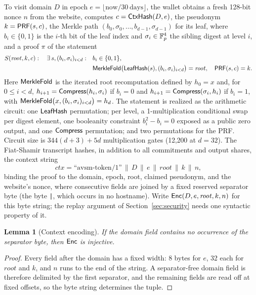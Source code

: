 \documentclass[11pt]{article}
\newtheorem{lemma}{Lemma}
\theoremstyle{definition}
\begin{document}
To visit domain $D$ in epoch $e = \lfloor \mathrm{now} / 30\ \mathrm{days} \rfloor$, the
wallet obtains a fresh 128-bit nonce $n$ from the website, computes $c = \mathsf{CtxHash}(D, e)$,
the pseudonym $k = \mathsf{PRF}(s, c)$, the Merkle path $(b_0, \sigma_0, \ldots, b_{d-1},
\sigma_{d-1})$ for its leaf, where $b_i \in \{0,1\}$ is the $i$-th bit of the leaf index
and $\sigma_i \in \mathbb{F}_p^4$ the sibling digest at level $i$, and a proof $\pi$ of the
statement
\begin{align*}
S(\mathit{root}, k, c):\quad \exists\, s, (b_i, \sigma_i)_{i<d}:\quad
& b_i \in \{0,1\},\\
& \mathsf{MerkleFold}\bigl(\mathsf{LeafHash}(s), (b_i, \sigma_i)_{i<d}\bigr) = \mathit{root},\quad
\mathsf{PRF}(s, c) = k.
\end{align*}
Here $\mathsf{MerkleFold}$ is the iterated root recomputation defined by $h_0 = x$ and, for $0 \le
i < d$, $h_{i+1} = \mathsf{Compress}(h_i, \sigma_i)$ if $b_i = 0$ and $h_{i+1} =
\mathsf{Compress}(\sigma_i, h_i)$ if $b_i = 1$, with $\mathsf{MerkleFold}\bigl(x, (b_i,
\sigma_i)_{i<d}\bigr) = h_d$. The statement is realized as the arithmetic circuit: one
$\mathsf{LeafHash}$ permutation; per level, a 1-multiplication conditional swap per digest
element, one booleanity constraint $b_i^2 - b_i = 0$ exposed as a public zero output, and
one $\mathsf{Compress}$ permutation; and two permutations for the PRF. Circuit size is $344(d+3) +
5d$ multiplication gates (12{,}200 at $d = 32$). The Fiat-Shamir transcript hashes, in
addition to all commitments and output shares, the context string
\[
\mathit{ctx} = \text{``avsm-token/1''} \,\|\, D \,\|\, e \,\|\, \mathit{root} \,\|\, k
\,\|\, n,
\]
binding the proof to the domain, epoch, root, claimed pseudonym, and the website's nonce,
where consecutive fields are joined by a fixed reserved separator byte (the byte
\texttt{|}, which occurs in no hostname). Write $\mathsf{Enc}(D, e, \mathit{root}, k, n)$ for this
byte string; the replay argument of Section~\ref{sec:security} needs one syntactic property
of it.

\begin{lemma}[Context encoding]
\label{lem:enc}
If the domain field contains no occurrence of the separator byte, then $\mathsf{Enc}$ is
injective.
\end{lemma}

\begin{proof}
Every field after the domain has a fixed width: 8 bytes for $e$, 32 each for
$\mathit{root}$ and $k$, and $n$ runs to the end of the string. A separator-free domain
field is therefore delimited by the first separator, and the remaining fields are read off
at fixed offsets, so the byte string determines the tuple.
\end{proof}
\end{document}
